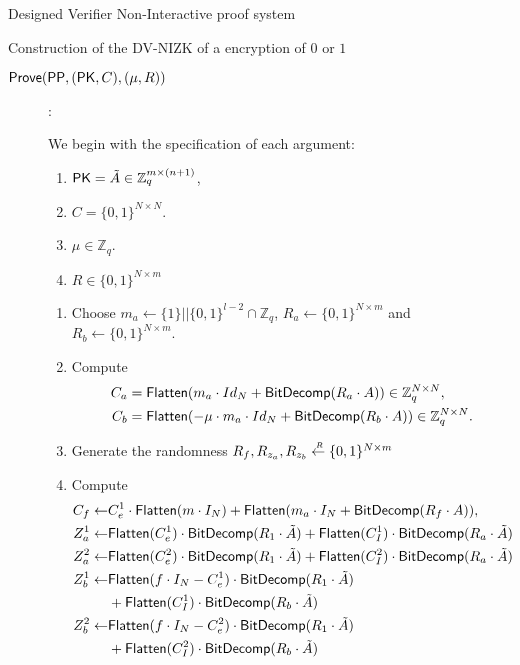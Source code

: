 \begin{section}{Designed Verifier Non-Interactive proof system}
\begin{subsection}{Construction of the DV-NIZK of a encryption of $0$ or $1$}
\begin{description}
      \item[${\mathsf{Prove}}({\mathsf{PP}}, (\mathsf{PK}, C), (\mu, R))$]:

        We begin with the specification of each argument:
        \begin{enumerate}
        \item $\mathsf{PK} = \tilde{A} \in\mathbb{Z}_q^{m \times (n+1)}$,
        \item $C = \{0,1\}^{N \times N}$.
        \item $\mu \in \mathbb{Z}_q$.
        \item $R \in \{0,1\}^{N \times m}$
        \end{enumerate}

        \begin{enumerate}
        \item Choose $m_a \gets \{1\}||\{0,1\}^{l-2} \cap \mathbb{Z}_q$, $R_a \gets \{0,1\}^{N \times m}$ and $R_b \gets \{0,1\}^{N \times m}$.
        \item Compute
          \begin{align*}
            C_a  &= {\mathsf{Flatten}}(m_a \cdot Id_{N} + {\mathsf{BitDecomp}}(R_a \cdot A)) \in \mathbb{Z}_q^{N \times N}, \\
            C_b  &= {\mathsf{Flatten}}(-\mu \cdot m_a \cdot Id_{N} + {\mathsf{BitDecomp}}(R_b \cdot A)) \in \mathbb{Z}_q^{N \times N}.
          \end{align*}

        \item Generate the randomness $R_f, R_{z_a}, R_{z_b} \stackrel{{\scriptscriptstyle \mkern4mu R}}{\gets} \{0,1\}^{N \times m}$

        \item Compute 
          \begin{align*}
            C_f \gets& C_e^1 \cdot  {\mathsf{Flatten}}(m \cdot I_N) + {\mathsf{Flatten}}(m_a \cdot I_N + {\mathsf{BitDecomp}}(R_f \cdot A)), \\
            Z_a^1 \gets& {\mathsf{Flatten}}(C_e^1) \cdot {\mathsf{BitDecomp}}(R_1 \cdot \tilde{A}) + {\mathsf{Flatten}}(C_I^1) \cdot {\mathsf{BitDecomp}}(R_a \cdot \tilde{A})\\
            Z_a^2 \gets& {\mathsf{Flatten}}(C_e^2) \cdot {\mathsf{BitDecomp}}(R_1 \cdot \tilde{A}) + {\mathsf{Flatten}}(C_I^2) \cdot {\mathsf{BitDecomp}}(R_a \cdot \tilde{A})\\
            Z_b^1 \gets& {\mathsf{Flatten}}(f \cdot I_N - C_e^1) \cdot {\mathsf{BitDecomp}}(R_1 \cdot \tilde{A}) \\
                     & + {\mathsf{Flatten}}(C_I^1) \cdot {\mathsf{BitDecomp}}(R_b \cdot \tilde{A})\\
            Z_b^2 \gets& {\mathsf{Flatten}}(f \cdot I_N - C_e^2) \cdot {\mathsf{BitDecomp}}(R_1 \cdot \tilde{A}) \\
                     & + {\mathsf{Flatten}}(C_I^2) \cdot {\mathsf{BitDecomp}}(R_b \cdot \tilde{A})
          \end{align*}
          

\end{enumerate}
\end{description}
\end{subsection}
\end{section}
